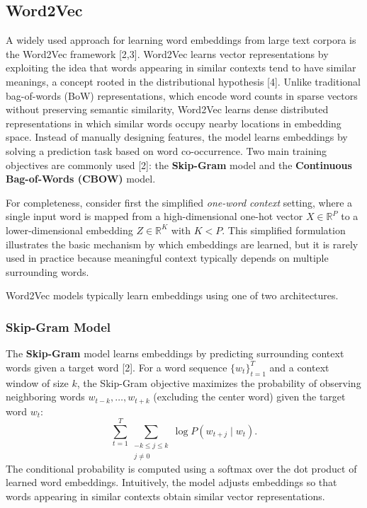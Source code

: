 \documentclass{article}
\renewcommand{\cite}[1]{[#1]}
\begin{document}
\subsection{Word2Vec}

A widely used approach for learning word embeddings from large text corpora is the Word2Vec framework \cite{2,3}. Word2Vec learns vector representations by exploiting the idea that words appearing in similar contexts tend to have similar meanings, a concept rooted in the distributional hypothesis \cite{4}. Unlike traditional bag-of-words (BoW) representations, which encode word counts in sparse vectors without preserving semantic similarity, Word2Vec learns dense distributed representations in which similar words occupy nearby locations in embedding space. Instead of manually designing features, the model learns embeddings by solving a prediction task based on word co-occurrence. Two main training objectives are commonly used \cite{2}: the \textbf{Skip-Gram} model and the \textbf{Continuous Bag-of-Words (CBOW)} model.

For completeness, consider first the simplified \emph{one-word context} setting, where a single input word is mapped from a high-dimensional one-hot vector \(X \in \mathbb{R}^P\) to a lower-dimensional embedding \(Z \in \mathbb{R}^K\) with \(K < P\). This simplified formulation illustrates the basic mechanism by which embeddings are learned, but it is rarely used in practice because meaningful context typically depends on multiple surrounding words. 

Word2Vec models typically learn embeddings using one of two architectures.

\subsubsection*{Skip-Gram Model}

The \textbf{Skip-Gram} model learns embeddings by predicting surrounding context words given a target word \cite{2}. For a word sequence \(\{w_t\}_{t=1}^T\) and a context window of size \(k\), the Skip-Gram objective maximizes the probability of observing neighboring words \(w_{t-k}, \ldots, w_{t+k}\) (excluding the center word) given the target word \(w_t\):
\[
\sum_{t=1}^{T} \sum_{\substack{-k \le j \le k \\ j \neq 0}} 
\log P(w_{t+j}\mid w_t).
\]
The conditional probability is computed using a softmax over the dot product of learned word embeddings. Intuitively, the model adjusts embeddings so that words appearing in similar contexts obtain similar vector representations.
\end{document}
